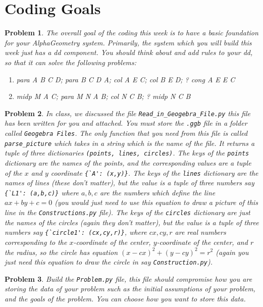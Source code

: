 \documentclass{article}
\newtheorem{problem}{Problem}
\begin{document}
\section{Coding Goals}

\begin{problem}
    The overall goal of the coding this week is to have a basic foundation for your AlphaGeometry system. Primarily, the system which you will build this week just has a dd component. You should think about and add rules to your dd, so that it can solve the following problems:
    \begin{enumerate}
        \item para A B C D; para B C D A; col A E C; col B E D; ? cong A E E C
        \item midp M A C; para M N A B; col N C B; ? midp N C B
    \end{enumerate}
\end{problem}

\begin{problem}
    In class, we discussed the file \verb|Read_in_Geogebra_File.py| this file has been written for you and attached. You must store the \verb|.ggb| file in a folder called \verb|Geogebra Files|. The only function that you need from this file is called \verb|parse_picture| which takes in a string which is the name of the file. It returns a tuple of three dictionaries \verb|(points, lines, circles)|. The keys of the \verb|points| dictionary are the names of the points, and the corresponding values are a tuple of the $x$ and $y$ coordinate \verb|{`A': (x,y)}|. The keys of the \verb|lines| dictionary are the names of lines (these don't matter), but the value is a tuple of three numbers say \verb|{`L1': (a,b,c)}| where $a,b,c$ are the numbers which define the line $ax+by+c =0$ (you would just need to use this equation to draw a picture of this line in the \verb|Constructions.py| file). The keys of the \verb|circles| dictionary are just the names of the circles (again they don't matter), but the value is a tuple of three numbers say \verb|{`circle1': (cx,cy,r)}|, where $cx,cy,r$ are real numbers corresponding to the $x$-coordinate of the center, $y$-coordinate of the center, and $r$ the radius, so the circle has equation $(x-cx)^2+(y-cy)^2 = r^2$ (again you just need this equation to draw the circle in say \verb|Construction.py|). 
\end{problem}

\begin{problem}
    Build the \verb|Problem.py| file, this file should compromise how you are storing the data of your problem such as the initial assumptions of your problem, and the goals of the problem. You can choose how you want to store this data. 
\end{problem}
\end{document}

